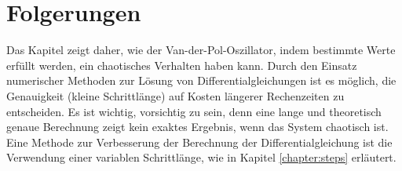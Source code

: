 %
%
%
\section{Folgerungen
\label{vanderpol:section:folgerungen}}
Das Kapitel zeigt daher, wie der Van-der-Pol-Oszillator, indem bestimmte Werte erfüllt werden, ein chaotisches Verhalten haben kann. Durch den Einsatz numerischer Methoden zur Lösung von Differentialgleichungen ist es möglich, die Genauigkeit (kleine Schrittlänge) auf Kosten längerer Rechenzeiten zu entscheiden. Es ist wichtig, vorsichtig zu sein, denn eine lange und theoretisch genaue Berechnung zeigt kein exaktes Ergebnis, wenn das System chaotisch ist. 
Eine Methode zur Verbesserung der Berechnung der Differentialgleichung ist die Verwendung einer variablen Schrittlänge, wie in Kapitel \ref{chapter:steps} erläutert. 